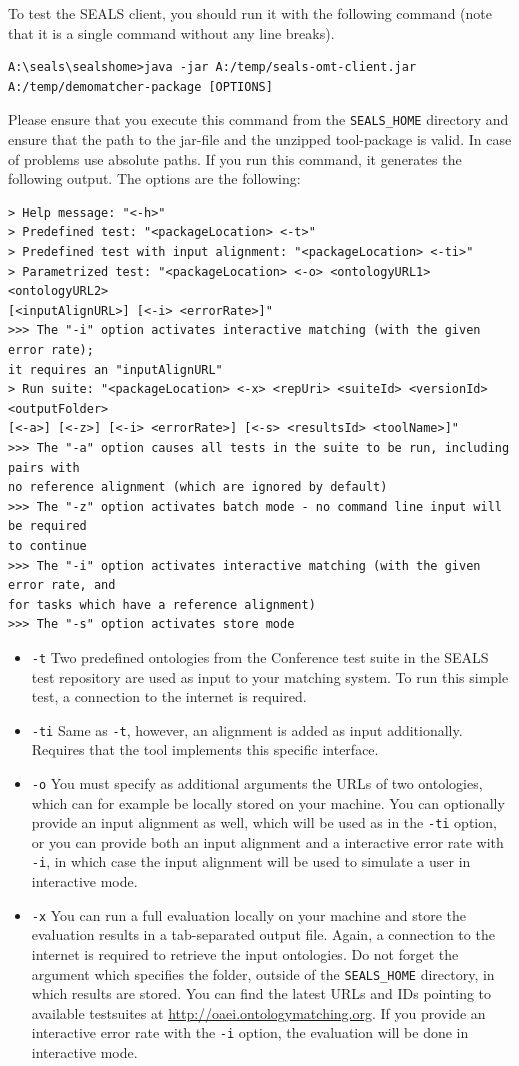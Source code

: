 \documentclass{article}
\begin{document}
To test the SEALS client, you should run it with the following command (note that it is a single command without any line breaks).
\begin{verbatim}
A:\seals\sealshome>java -jar A:/temp/seals-omt-client.jar
A:/temp/demomatcher-package [OPTIONS]
\end{verbatim}
Please ensure that you execute this command from the \verb|SEALS_HOME| directory and ensure that the path to the jar-file and the unzipped tool-package is valid. In case of problems use absolute paths. If you run this command, it generates the following output.
The options are the following:
\small
\begin{verbatim}
> Help message: "<-h>"
> Predefined test: "<packageLocation> <-t>"
> Predefined test with input alignment: "<packageLocation> <-ti>"
> Parametrized test: "<packageLocation> <-o> <ontologyURL1> <ontologyURL2>
[<inputAlignURL>] [<-i> <errorRate>]"
>>> The "-i" option activates interactive matching (with the given error rate);
it requires an "inputAlignURL"
> Run suite: "<packageLocation> <-x> <repUri> <suiteId> <versionId> <outputFolder>
[<-a>] [<-z>] [<-i> <errorRate>] [<-s> <resultsId> <toolName>]"
>>> The "-a" option causes all tests in the suite to be run, including pairs with
no reference alignment (which are ignored by default)
>>> The "-z" option activates batch mode - no command line input will be required
to continue
>>> The "-i" option activates interactive matching (with the given error rate, and
for tasks which have a reference alignment)
>>> The "-s" option activates store mode
\end{verbatim}
\normalsize
\begin{itemize}
	\item \verb|-t| Two predefined ontologies from the Conference test suite in the SEALS test repository are used as input to your matching system. To run this simple test, a connection to the internet is required.
	\item \verb|-ti| Same as \verb|-t|, however, an alignment is added as input additionally. Requires that the tool implements this specific interface.
	\item \verb|-o| You must specify as additional arguments the URLs of two ontologies, which can for example be locally stored on your machine. You can optionally provide an input alignment as well, which will be used as in the \verb|-ti| option, or you can provide both an input alignment and a interactive error rate with \verb|-i|, in which case the input alignment will be used to simulate a user in interactive mode.
	\item \verb|-x| You can run a full evaluation locally on your machine and store the evaluation results in a tab-separated output file. Again, a connection to the internet is required to retrieve the input ontologies. Do not forget the argument which specifies the folder, outside of the \verb|SEALS_HOME| directory, in which results are stored. You can find the latest URLs and IDs pointing to available testsuites at \url{http://oaei.ontologymatching.org}. If you provide an interactive error rate with the \verb|-i| option, the evaluation will be done in interactive mode.
\end{itemize}
\end{document}
